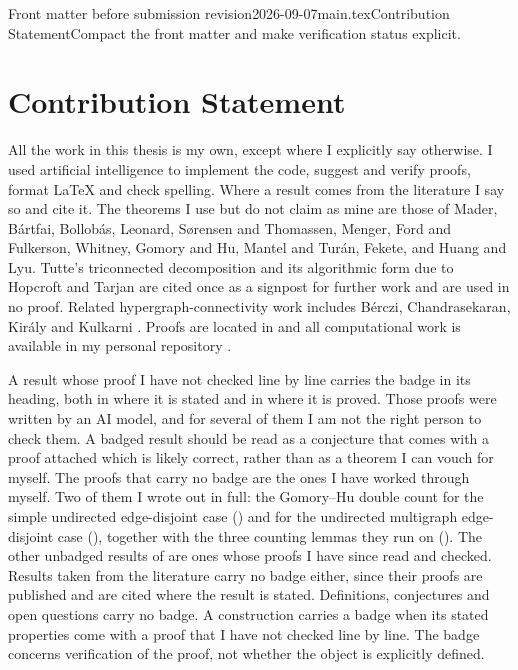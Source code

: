 \begin{offcut}{Front matter before submission revision}{2026-09-07}{main.tex}{Contribution Statement}{Compact the front matter and make verification status explicit.}
\chapter*{Contribution Statement}
All the work in this thesis is my own, except where I explicitly say otherwise.
I used artificial intelligence to implement the code, suggest and verify proofs, format \LaTeX{} and check spelling.
Where a result comes from the literature I say so and cite it.
The theorems I use but do not claim as mine are those of Mader, B\'{a}rtfai, Bollob\'{a}s, Leonard, S{\o}rensen and Thomassen, Menger, Ford and Fulkerson, Whitney, Gomory and Hu, Mantel and Tur\'an, Fekete, and Huang and Lyu. Tutte's triconnected decomposition and its algorithmic form due to Hopcroft and Tarjan are cited once as a signpost for further work and are used in no proof.
Related hypergraph-connectivity work includes B\'{e}rczi, Chandrasekaran, Kir\'{a}ly and Kulkarni \cite{BercziEtAl24}.
Proofs are located in  and all computational work is available in my personal repository \cite{vandenbruwaene_thesis}.

A result whose proof I have not checked line by line carries the badge \aimedal{} in its heading, both in  where it is stated and in  where it is proved.
Those proofs were written by an AI model, and for several of them I am not the right person to check them.
A badged result should be read as a conjecture that comes with a proof attached which is likely correct, rather than as a theorem I can vouch for myself.
The proofs that carry no badge are the ones I have worked through myself.
Two of them I wrote out in full: the Gomory--Hu double count for the simple undirected edge-disjoint case () and for the undirected multigraph edge-disjoint case (), together with the three counting lemmas they run on ().
The other unbadged results of  are ones whose proofs I have since read and checked.
Results taken from the literature carry no badge either, since their proofs are published and are cited where the result is stated.
Definitions, conjectures and open questions carry no badge. A construction carries a badge when its stated properties come with a proof that I have not checked line by line. The badge concerns verification of the proof, not whether the object is explicitly defined.


\end{offcut}
